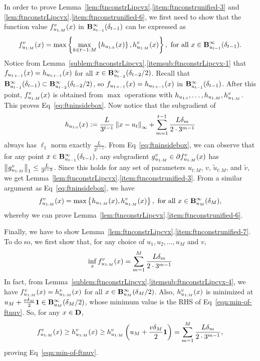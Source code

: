 In order to prove Lemma~\ref{lem:ftnconstrLipcvx}.\ref{item:ftnconstrunified-3} and \ref{lem:ftnconstrLipcvx}.\ref{item:ftnconstrunified-6}, 
we first need to show that the function value $f_{u_{1:M}}^v(x)$ in $\mathbf{B}^\infty_{u_{t-1}}({\delta_{t-1}})$ can be expressed as
\begin{equation}
\label{eq:ftninsidebox}
f_{u_{1:M}}^v(x) = \max \left \{ \max_{k \in t-1:M}\left \{ h_{u_{1:{k}}}(x) \right \}, h^{v}_{u_{1:M}}(x) \right \},\text{ for all } x \in \mathbf{B}^\infty_{u_{t-1}}({\delta_{t-1}}).
\end{equation}
Notice from Lemma~\ref{sublem:ftnconstrLipcvx}.\ref{itemsub:ftnconstrLipcvx-1} that 
$f_{u_{1:{t-1}}}(x) = h_{u_{1:{t-1}}}(x)$ for all $x \in \mathbf{B}^\infty_{u_{t-2}}({\delta_{t-2}/2})$.
Recall that $\mathbf{B}^\infty_{u_{t-1}}({\delta_{t-1}}) \subset \mathbf{B}^\infty_{u_{t-2}}({\delta_{t-2}/2})$, so $f_{u_{1:{t-1}}}(x) = h_{u_{1:{t-1}}}(x)$ in $\mathbf{B}^\infty_{u_{t-1}}({\delta_{t-1}})$.
After this point, $f_{u_{1:M}}^v(x)$ is obtained from $\max$ operations with $h_{u_{1:{t}}}, \dots, h_{u_{1:{M}}}, h^{v}_{u_{1:M}}$.
This proves Eq~\eqref{eq:ftninsidebox}. 
Now notice that the subgradient of 
\begin{equation*}
h_{u_{1:{t}}} (x) := \frac{L}{3^{t-1}} \left\|{x-u_{t}}\right\|_\infty + \sum_{m=1}^{t-1} \frac{L \delta_m}{2 \cdot 3^{m-1}}
\end{equation*}
always has $\ell_1$ norm exactly $\frac{L}{3^{t-1}}$.
From Eq~\eqref{eq:ftninsidebox}, we can observe that for any point $x \in \mathbf{B}^\infty_{u_{t-1}}({\delta_{t-1}})$, 
any subgradient $g_{u_{1:M}}^v \in \partial f_{u_{1:M}}^v(x)$ has $\left\|{g_{u_{1:M}}^v}\right\|_1 \leq \frac{L}{3^{t-2}}$.
Since this holds for any set of parameters $u_{t:M}$, $v$, $\tilde u_{t:M}$, and $\tilde v$, we get Lemma~\ref{lem:ftnconstrLipcvx}.\ref{item:ftnconstrunified-3}.
From a similar argument as Eq~\eqref{eq:ftninsidebox}, we have
\begin{equation*}
f_{u_{1:M}}^v(x) = \max \left \{ h_{u_{1:{M}}}(x), h^{v}_{u_{1:M}}(x) \right \}, \text{ for all } x \in \mathbf{B}^\infty_{u_{M}}({\delta_{M}}),
\end{equation*}
whereby we can prove Lemma~\ref{lem:ftnconstrLipcvx}.\ref{item:ftnconstrunified-6}.

Finally, we have to show Lemma~\ref{lem:ftnconstrLipcvx}.\ref{item:ftnconstrunified-7}. 
To do so, we first show that, for any choice of $u_1, u_2, \ldots, u_M$ and $v$, 
\begin{equation}
\label{eqn:min-of-ftnuv}
\inf_{x} f_{u_{1:M}}^v(x) = \sum_{m=1}^{M} \frac{L\delta_m}{2\cdot3^{m-1}}
\end{equation}
In fact, from Lemma~\ref{sublem:ftnconstrLipcvx}.\ref{itemsub:ftnconstrLipcvx-4}, 
we have $f_{u_{1:M}}^v(x) = h^{v}_{u_{1:M}}(x)$ for all $x \in \mathbf{B}^\infty_{u_{M}}({\delta_{M}/2})$.
Also, $h^{v}_{u_{1:M}}(x)$ is minimized at $u_M+ \frac{v \delta_M}{2} \mathbf{1} \in \mathbf{B}^\infty_{u_{M}}({\delta_{M}/2})$,
whose minimum value is the RHS of Eq~\eqref{eqn:min-of-ftnuv}.
So, for any $x \in \mathbf{D}$, 
\begin{equation*}
f_{u_{1:M}}^v(x) \geq h^{v}_{u_{1:M}}(x) 
\geq h^{v}_{u_{1:M}}\left (u_M+ \frac{v \delta_M}{2} \mathbf{1}\right ) 
= \sum_{m=1}^{M} \frac{L\delta_m}{2\cdot3^{m-1}},
\end{equation*}
proving Eq~\eqref{eqn:min-of-ftnuv}.

